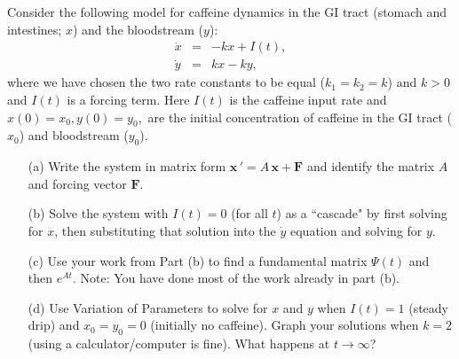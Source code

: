 \documentclass[11pt,letterpaper,boxed]{hmcpset}
\begin{document}
\begin{problem}[5.]
Consider the following model for caffeine dynamics in the GI tract (stomach and intestines; $x$) and the bloodstream ($y$):
\begin{eqnarray*}
\dot{x} & = &   -kx +I(t),  \\
  \dot{y} & =  & kx-ky, 
  \end{eqnarray*}
where we have chosen the two rate constants to be equal ($k_1=k_2=k$) and $k>0$ and $I(t)$ is a forcing term.
Here $I(t)$ is the caffeine input rate and $x(0)=x_0, y(0)=y_0,$ are the initial concentration of caffeine in the GI tract ($x_0$) and bloodstream ($y_0$). 

\begin{enumerate}

\item[(a)] Write the system in matrix form $\mathbf{x}\, ' = A \, \mathbf{x} + \mathbf{F}$ and identify the matrix $A$ and forcing vector $\mathbf{F}$.  

\item[(b)] Solve the system  with $I(t)=0$ (for all $t$) as a ``cascade" by first solving for $x$, then substituting that solution into the $\dot{y}$ equation and solving for $y$.


\item[(c)] Use your work from Part (b) to find a fundamental matrix $\Psi(t)$ and then $e^{At}$.  Note: You have done most of the work already in part (b).


\item[(d)] Use Variation of Parameters 
to solve for $x$ and $y$ when $I(t)=1$ (steady drip) and $x_0=y_0=0$ (initially no caffeine). Graph your
solutions when $k=2$ (using a calculator/computer is fine).   What happens at $t \to \infty$?
\end{enumerate}

 \end{problem}

\begin{solution}
\vfill
\end{solution}
\newpage
\end{document}
